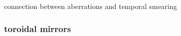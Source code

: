 %
%


connection between aberrations and temporal smearing \cite{bourassin-bouchetHowFocusAttosecond2013}



\subsubsection{toroidal mirrors}


